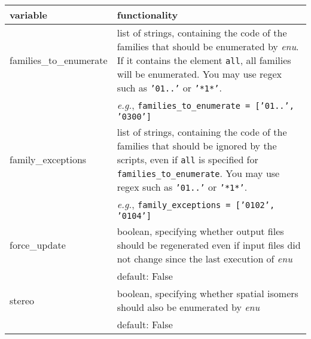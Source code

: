 \documentclass[a4paper,11pt]{article}
\begin{document}
\begin{table}[H]
\begin{tabular}{>{\ttfamily\raggedright}p{}|p{}}
    \hline
    \textnormal{variable} & functionality \\
    \hline\hline
    families\_to\_enumerate & list of strings, containing the code of the families that should be enumerated by \textit{enu}. If it contains the element \texttt{all}, all families will be enumerated. You may use regex such as \texttt{'01..'} or \texttt{'*1*'}.\\
    & \textit{e.g.}, \texttt{families\_to\_enumerate = ['01..', '0300']}\\
    \hline
    family\_exceptions & list of strings, containing the code of the families that should be ignored by the scripts, even if \texttt{all} is specified for \texttt{families\_to\_enumerate}. You may use regex such as \texttt{'01..'} or \texttt{'*1*'}.\\
    & \textit{e.g.}, \texttt{family\_exceptions = ['0102', '0104']}\\
    \hline
    force\_update & boolean, specifying whether output files should be regenerated even if input files did not change since the last execution of \textit{enu}\\
    & default: False\\
    \hline
    stereo & boolean, specifying whether spatial isomers should also be enumerated by \textit{enu}\\
    & default: False\\
    \hline
\end{tabular}
\end{table}


\renewcommand\bibname{References}


\end{document}
